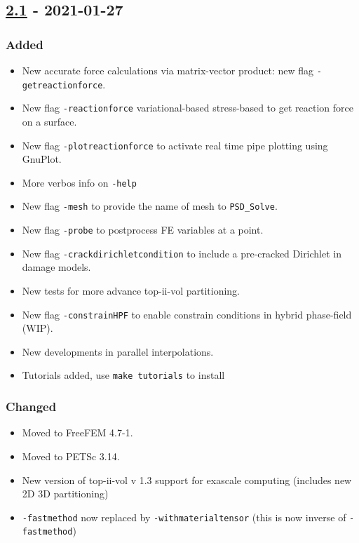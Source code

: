 \subsection{\texorpdfstring{\href{https://gitlab.com/PsdSolver/psd_sources/-/tree/v2.1}{2.1}
- 2021-01-27}{2.1 - 2021-01-27}}\label{section-1}

\subsubsection{Added}\label{added-2}

\begin{itemize}
\tightlist
\item
  New accurate force calculations via matrix-vector product: new flag
  \lstinline!-getreactionforce!.
\item
  New flag \lstinline!-reactionforce! variational-based \textbar{}
  stress-based to get reaction force on a surface.
\item
  New flag \lstinline!-plotreactionforce! to activate real time pipe
  plotting using GnuPlot.
\item
  More verbos info on \lstinline!-help!
\item
  New flag \lstinline!-mesh! to provide the name of mesh to
  \lstinline!PSD_Solve!.
\item
  New flag \lstinline!-probe! to postprocess FE variables at a point.
\item
  New flag \lstinline!-crackdirichletcondition! to include a pre-cracked
  Dirichlet in damage models.
\item
  New tests for more advance top-ii-vol partitioning.
\item
  New flag \lstinline!-constrainHPF! to enable constrain conditions in
  hybrid phase-field (WIP).
\item
  New developments in parallel interpolations.
\item
  Tutorials added, use \lstinline!make tutorials! to install
\end{itemize}

\subsubsection{Changed}\label{changed-2}

\begin{itemize}
\tightlist
\item
  Moved to FreeFEM 4.7-1.
\item
  Moved to PETSc 3.14.
\item
  New version of top-ii-vol v 1.3 support for exascale computing
  (includes new 2D 3D partitioning)
\item
  \lstinline!-fastmethod! now replaced by
  \lstinline!-withmaterialtensor! (this is now inverse of
  \lstinline!-fastmethod!)
\end{itemize}

